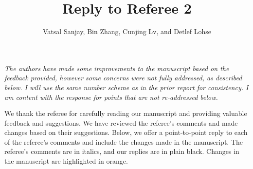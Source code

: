 \documentclass[]{article}
\title{Reply to Referee 2}
\author{Vatsal Sanjay, Bin Zhang, Cunjing Lv, and Detlef Lohse}
\date{}
\begin{document}
	
\maketitle
	
\textit{The authors have made some improvements to the manuscript based on the feedback provided, however some concerns were not fully addressed, as described below. I will use the same number scheme as in the prior report for consistency. I am content with the response for points that are not re-addressed below.}

We thank the referee for carefully reading our manuscript and providing valuable feedback and suggestions. We have reviewed the referee's comments and made changes based on their suggestions. Below, we offer a point-to-point reply to each of the referee's comments and include the changes made in the manuscript. The referee's comments are in italics, and our replies are in plain black. Changes in the manuscript are highlighted in orange.
\end{document}
